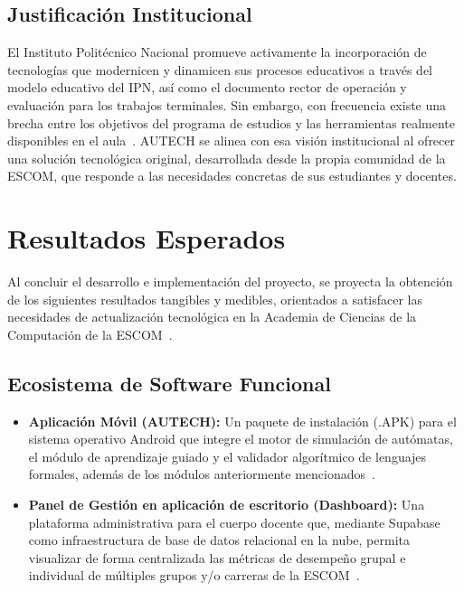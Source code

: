 \subsection{Justificación Institucional}
\label{ssec:just_institucional}

El Instituto Politécnico Nacional promueve activamente la incorporación de tecnologías que
modernicen y dinamicen sus procesos educativos a través del modelo educativo del IPN, así como
el documento rector de operación y evaluación para los trabajos terminales. Sin embargo, con
frecuencia existe una brecha entre los objetivos del programa de estudios y las herramientas
realmente disponibles en el aula~\cite{ipn2020, escom2016}. AUTECH se alinea con esa visión
institucional al ofrecer una solución tecnológica original, desarrollada desde la propia
comunidad de la ESCOM, que responde a las necesidades concretas de sus estudiantes y docentes.

\section{Resultados Esperados}
\label{sec:resultados}

Al concluir el desarrollo e implementación del proyecto, se proyecta la obtención de los
siguientes resultados tangibles y medibles, orientados a satisfacer las necesidades de
actualización tecnológica en la Academia de Ciencias de la Computación de la
ESCOM~\cite{ipn2020, escom2016}.

\subsection{Ecosistema de Software Funcional}
\label{ssec:ecosistema}

\begin{itemize}
    \item \textbf{Aplicación Móvil (AUTECH):} Un paquete de instalación (.APK) para el
        sistema operativo Android que integre el motor de simulación de autómatas, el módulo
        de aprendizaje guiado y el validador algorítmico de lenguajes formales, además de los
        módulos anteriormente mencionados~\cite{crompton2018}.

    \item \textbf{Panel de Gestión en aplicación de escritorio (Dashboard):} Una plataforma
        administrativa para el cuerpo docente que, mediante Supabase como infraestructura de
        base de datos relacional en la nube, permita visualizar de forma centralizada las
        métricas de desempeño grupal e individual de múltiples grupos y/o carreras de la
        ESCOM~\cite{supabase2024}.
\end{itemize}

